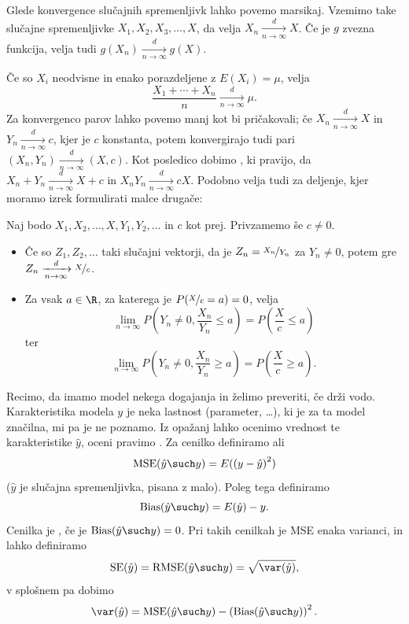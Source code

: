 Glede konvergence slučajnih spremenljivk lahko povemo marsikaj.
Vzemimo take slučajne spremenljivke
$X_1, X_2, X_3, \ldots, X$, da velja $X_n
\xrightarrow[n \to \infty]{d} X$.
Če je $g$ zvezna funkcija, velja tudi $g(X_n) \xrightarrow[n \to \infty]{d} g(X)$.

Če so $X_i$ neodvisne in enako porazdeljene z $E(X_i) = \mu$, velja 
\[
  \frac{X_1 + \cdots + X_n}{n} \xrightarrow[n \to \infty]{d} \mu.
\]
Za konvergenco parov lahko povemo manj kot bi pričakovali; če $X_n
\xrightarrow[n \to \infty]{d} X$ in $Y_n \xrightarrow[n \to \infty]{d} c$, kjer
je $c$ konstanta, potem konvergirajo tudi pari $(X_n, Y_n) \xrightarrow[n \to
\infty]{d} (X, c)$.
Kot posledico dobimo , ki pravijo, da $X_n + Y_n
\xrightarrow[n \to \infty]{d} X + c$ in $X_n Y_n \xrightarrow[n \to \infty]{d}
cX$.
Podobno velja tudi za deljenje, kjer moramo izrek formulirati malce drugače:

\begin{trditev}
  Naj bodo $X_1, X_2, \ldots, X, Y_1, Y_2, \ldots$ in $c$ kot prej.
  Privzamemo še $c \ne 0$.
  \begin{itemize}
  \item Če so $Z_1, Z_2, \ldots$ taki slučajni vektorji,
	da je $Z_n = \nicefrac{X_n}{Y_n}$ za $Y_n \ne 0$, potem gre $Z_n
	\xrightarrow[n \to \infty]{d} \nicefrac{X}{c}$.
  \item
	Za vsak $a \in \R$, za katerega je $P(\nicefrac{X}{c} = a) = 0$, velja
	\[
	  \lim_{n \to \infty} P\!\left(Y_n \ne 0, \frac{X_n}{Y_n} \le a\right) =
	  P\!\left(\frac{X}{c} \le a \right)
	\]
	ter
	\[
	  \lim_{n \to \infty} P\!\left( Y_n \ne 0, \frac{X_n}{Y_n} \ge a \right) =
	  P\!\left(\frac{X}{c} \ge a\right).
	\]
  \end{itemize}
\end{trditev}


Recimo, da imamo model nekega dogajanja in želimo preveriti, če drži vodo.
Karakteristika modela $y$ je neka lastnost (parameter, \ldots), ki je za ta
model značilna, mi pa je ne poznamo.
Iz opažanj lahko ocenimo vrednost te karakteristike $\hat{y}$, oceni pravimo
.
Za cenilko definiramo  ali 
\[
  \operatorname{MSE}(\hat{y} \such y) = E({(y - \hat{y})}^2)
\]
($\hat{y}$ je slučajna spremenljivka, pisana z malo).
Poleg tega definiramo 
\[
  \operatorname{Bias}(\hat{y} \such y) = E(\hat{y}) - y.
\]
Cenilka je , če je $\operatorname{Bias}(\hat{y} \such y) =
0$.
Pri takih cenilkah je MSE enaka varianci, in lahko definiramo
\[
  \operatorname{SE}(\hat{y}) = \operatorname{RMSE}(\hat{y} \such y) =
  \sqrt{\var(\hat{y})},
\]
v splošnem pa dobimo
\[
  \var(\hat{y}) = \operatorname{MSE}(\hat{y} \such y) - \left(
	\operatorname{Bias}(\hat{y} \such y) \right)^2.
\]

